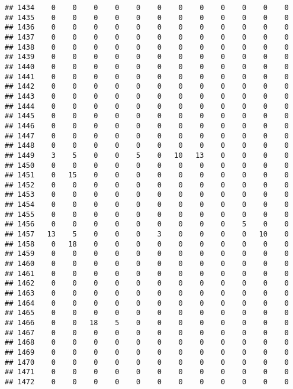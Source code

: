 \documentclass[]{article}
\begin{document}
\begin{verbatim}
## 1434    0    0    0    0    0    0    0    0    0    0    0    0
## 1435    0    0    0    0    0    0    0    0    0    0    0    0
## 1436    0    0    0    0    0    0    0    0    0    0    0    0
## 1437    0    0    0    0    0    0    0    0    0    0    0    0
## 1438    0    0    0    0    0    0    0    0    0    0    0    0
## 1439    0    0    0    0    0    0    0    0    0    0    0    0
## 1440    0    0    0    0    0    0    0    0    0    0    0    0
## 1441    0    0    0    0    0    0    0    0    0    0    0    0
## 1442    0    0    0    0    0    0    0    0    0    0    0    0
## 1443    0    0    0    0    0    0    0    0    0    0    0    0
## 1444    0    0    0    0    0    0    0    0    0    0    0    0
## 1445    0    0    0    0    0    0    0    0    0    0    0    0
## 1446    0    0    0    0    0    0    0    0    0    0    0    0
## 1447    0    0    0    0    0    0    0    0    0    0    0    0
## 1448    0    0    0    0    0    0    0    0    0    0    0    0
## 1449    3    5    0    0    5    0   10   13    0    0    0    0
## 1450    0    0    0    0    0    0    0    0    0    0    0    0
## 1451    0   15    0    0    0    0    0    0    0    0    0    0
## 1452    0    0    0    0    0    0    0    0    0    0    0    0
## 1453    0    0    0    0    0    0    0    0    0    0    0    0
## 1454    0    0    0    0    0    0    0    0    0    0    0    0
## 1455    0    0    0    0    0    0    0    0    0    0    0    0
## 1456    0    0    0    0    0    0    0    0    0    5    0    0
## 1457   13    5    0    0    0    3    0    0    0    0   10    0
## 1458    0   18    0    0    0    0    0    0    0    0    0    0
## 1459    0    0    0    0    0    0    0    0    0    0    0    0
## 1460    0    0    0    0    0    0    0    0    0    0    0    0
## 1461    0    0    0    0    0    0    0    0    0    0    0    0
## 1462    0    0    0    0    0    0    0    0    0    0    0    0
## 1463    0    0    0    0    0    0    0    0    0    0    0    0
## 1464    0    0    0    0    0    0    0    0    0    0    0    0
## 1465    0    0    0    0    0    0    0    0    0    0    0    0
## 1466    0    0   18    5    0    0    0    0    0    0    0    0
## 1467    0    0    0    0    0    0    0    0    0    0    0    0
## 1468    0    0    0    0    0    0    0    0    0    0    0    0
## 1469    0    0    0    0    0    0    0    0    0    0    0    0
## 1470    0    0    0    0    0    0    0    0    0    0    0    0
## 1471    0    0    0    0    0    0    0    0    0    0    0    0
## 1472    0    0    0    0    0    0    0    0    0    0    0    0

\end{verbatim}
\end{document}
